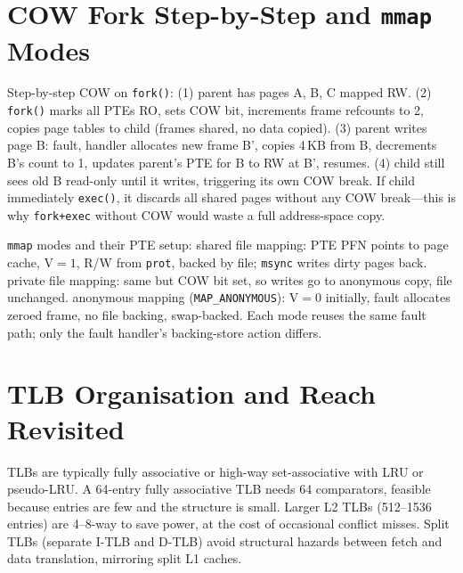 \begin{center}
\end{center}

\section{COW Fork Step-by-Step and \texttt{mmap} Modes}
Step-by-step COW on \texttt{fork()}:
(1) parent has pages A, B, C mapped RW.
(2) \texttt{fork()} marks all PTEs RO, sets COW bit, increments frame refcounts to 2, copies page tables to child (frames shared, no data copied).
(3) parent writes page B: fault, handler allocates new frame B', copies 4\,KB from B, decrements B's count to 1, updates parent's PTE for B to RW at B', resumes.
(4) child still sees old B read-only until it writes, triggering its own COW break.
If child immediately \texttt{exec()}, it discards all shared pages without any COW break---this is why \texttt{fork+exec} without COW would waste a full address-space copy.

\texttt{mmap} modes and their PTE setup:
shared file mapping: PTE PFN points to page cache, V$=1$, R/W from \texttt{prot}, backed by file; \texttt{msync} writes dirty pages back.
private file mapping: same but COW bit set, so writes go to anonymous copy, file unchanged.
anonymous mapping (\texttt{MAP\_ANONYMOUS}): V$=0$ initially, fault allocates zeroed frame, no file backing, swap-backed.
Each mode reuses the same fault path; only the fault handler's backing-store action differs.

\section{TLB Organisation and Reach Revisited}
TLBs are typically fully associative or high-way set-associative with LRU or pseudo-LRU. A 64-entry fully associative TLB needs 64 comparators, feasible because entries are few and the structure is small. Larger L2 TLBs (512--1536 entries) are 4--8-way to save power, at the cost of occasional conflict misses. Split TLBs (separate I-TLB and D-TLB) avoid structural hazards between fetch and data translation, mirroring split L1 caches.

